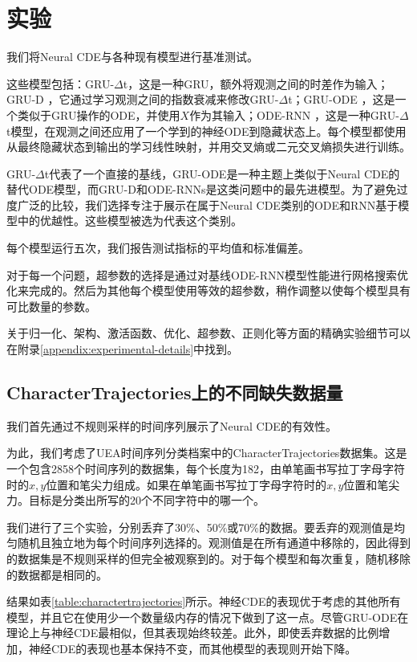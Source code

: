 \documentclass{ctexart}
\theoremstyle{plain}
\theoremstyle{definition}
\begin{document}
\section{实验}
我们将Neural CDE与各种现有模型进行基准测试。

这些模型包括：GRU-$\Delta$t，这是一种GRU，额外将观测之间的时差作为输入；GRU-D \cite{Che2018}，它通过学习观测之间的指数衰减来修改GRU-$\Delta$t；GRU-ODE \cite{gru-ode-bayes, gruode}，这是一个类似于GRU操作的ODE，并使用$X$作为其输入；ODE-RNN \cite{latent-odes}，这是一种GRU-$\Delta$t模型，在观测之间还应用了一个学到的神经ODE到隐藏状态上。每个模型都使用从最终隐藏状态到输出的学习线性映射，并用交叉熵或二元交叉熵损失进行训练。

GRU-$\Delta$t代表了一个直接的基线，GRU-ODE是一种主题上类似于Neural CDE的替代ODE模型，而GRU-D和ODE-RNNs是这类问题中的最先进模型。为了避免过度广泛的比较，我们选择专注于展示在属于Neural CDE类别的ODE和RNN基于模型中的优越性。这些模型被选为代表这个类别。

每个模型运行五次，我们报告测试指标的平均值和标准偏差。

对于每一个问题，超参数的选择是通过对基线ODE-RNN模型性能进行网格搜索优化来完成的。然后为其他每个模型使用等效的超参数，稍作调整以使每个模型具有可比数量的参数。

关于归一化、架构、激活函数、优化、超参数、正则化等方面的精确实验细节可以在附录\ref{appendix:experimental-details}中找到。

\subsection{CharacterTrajectories上的不同缺失数据量}
我们首先通过不规则采样的时间序列展示了Neural CDE的有效性。

为此，我们考虑了UEA时间序列分类档案中的CharacterTrajectories数据集\cite{uea}。这是一个包含2858个时间序列的数据集，每个长度为182，由单笔画书写拉丁字母字符时的$x, y$位置和笔尖力组成。如果在单笔画书写拉丁字母字符时的$x, y$位置和笔尖力。目标是分类出所写的20个不同字符中的哪一个。

我们进行了三个实验，分别丢弃了30\%、50\%或70\%的数据。要丢弃的观测值是均匀随机且独立地为每个时间序列选择的。观测值是在所有通道中移除的，因此得到的数据集是不规则采样的但完全被观察到的。对于每个模型和每次重复，随机移除的数据都是相同的。

结果如表\ref{table:charactertrajectories}所示。神经CDE的表现优于考虑的其他所有模型，并且它在使用少一个数量级内存的情况下做到了这一点。尽管GRU-ODE在理论上与神经CDE最相似，但其表现始终较差。此外，即使丢弃数据的比例增加，神经CDE的表现也基本保持不变，而其他模型的表现则开始下降。
\end{document}
